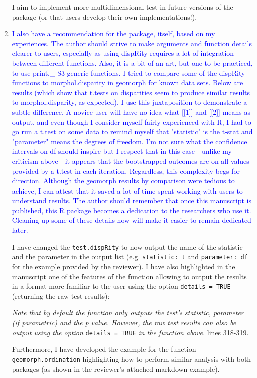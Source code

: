 \documentclass[12pt,letterpaper]{article}
\begin{document}
\begin{enumerate}
I aim to implement more multidimensional test in future versions of the package (or that users develop their own implementations!).

\item{\textcolor{blue}{I also have a recommendation for the package, itself, based on my experiences. 
The author should strive to make arguments and function details clearer to users, especially as using dispRity requires a lot of integration between different functions. 
Also, it is a bit of an art, but one to be practiced, to use print.\_ S3 generic functions. 
I tried to compare some of the dispRity functions to morphol.disparity in geomorph for known data sets. 
Below are results (which show that t.tests on disparities seem to produce similar results to morphol.disparity, as expected). 
I use this juxtaposition to demonstrate a subtle difference. 
A novice user will have no idea what [[1]] and [[2]] means as output, and even though I consider myself fairly experienced with R, I had to go run a t.test on some data to remind myself that "statistic" is the t-stat and "parameter" means the degrees of freedom. 
I'm not sure what the confidence intervals on df should inspire but I respect that in this case - unlike my criticism above - it appears that the bootstrapped outcomes are on all values provided by a t.test in each iteration. 
Regardless, this complexity begs for direction. 
Although the geomorph results by comparison were tedious to achieve, I can attest that it saved a lot of time spent working with users to understand results. 
The author should remember that once this manuscript is published, this R package becomes a dedication to the researchers who use it. 
Cleaning up some of these details now will make it easier to remain dedicated later.}}

I have changed the \texttt{test.dispRity} to now output the name of the statistic and the parameter in the output list (e.g. \texttt{statistic: t} and \texttt{parameter: df} for the example provided by the reviewer).
I have also highlighted in the manuscript one of the features of the function allowing to output the results in a format more familiar to the user using the option \texttt{details = TRUE} (returning the raw test results):

\textit{Note that by default the function only outputs the test's statistic, parameter (if parametric) and the p value. However, the raw test results can also be output using the option} \texttt{details = TRUE} \textit{in the function above.} lines 318-319.

Furthermore, I have developed the example for the function \texttt{geomorph.ordination} highlighting how to perform similar analysis with both packages (as shown in the reviewer's attached markdown example).

\end{enumerate}
\end{document}
